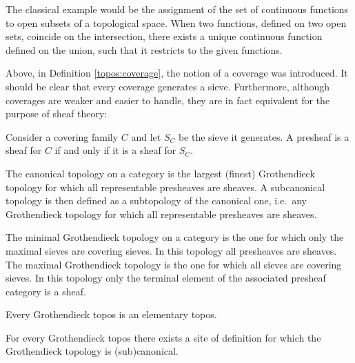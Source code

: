 \begin{example}
        The classical example would be the assignment of the set of continuous functions to open subsets of a topological space. When two functions, defined on two open sets, coincide on the intersection, there exists a unique continuous function defined on the union, such that it restricts to the given functions.
    \end{example}

    Above, in Definition \ref{topos:coverage}, the notion of a coverage was introduced. It should be clear that every coverage generates a sieve. Furthermore, although coverages are weaker and easier to handle, they are in fact equivalent for the purpose of sheaf theory:
    \begin{property}
        Consider a covering family $C$ and let $S_C$ be the sieve it generates. A presheaf is a sheaf for $C$ if and only if it is a sheaf for $S_C$.
    \end{property}

    \begin{example}
        The canonical topology on a category is the largest (finest) Grothendieck topology for which all representable presheaves are sheaves. A subcanonical topology is then defined as a subtopology of the canonical one, i.e.~any Grothendieck topology for which all representable presheaves are sheaves.
    \end{example}
    \begin{example}
        The minimal Grothendieck topology on a category is the one for which only the maximal sieves are covering sieves. In this topology all presheaves are sheaves. The maximal Grothendieck topology is the one for which all sieves are covering sieves. In this topology only the terminal element of the associated presheaf category is a sheaf.
    \end{example}

    \begin{property}
        Every Grothendieck topos is an elementary topos.
    \end{property}

    \begin{property}
        For every Grothendieck topos there exists a site of definition for which the Grothendieck topology is (sub)canonical.
    \end{property}

